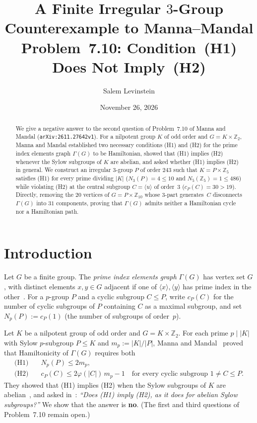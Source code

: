 \documentclass[11pt]{article}
\title{A Finite Irregular $3$-Group Counterexample to Manna--Mandal Problem~7.10: Condition~(H1) Does Not Imply~(H2)}
\author{Salem Levinstein}
\date{November 26, 2026}
\begin{document}
\maketitle

\begin{abstract}
We give a negative answer to the second question of Problem~7.10 of Manna and Mandal (\texttt{arXiv:2611.27642v1}). For a nilpotent group $K$ of odd order and $G = K \times \mathbb{Z}_2$, Manna and Mandal established two necessary conditions (H1) and (H2) for the prime index elements graph $\Gamma(G)$ to be Hamiltonian, showed that (H1) implies (H2) whenever the Sylow subgroups of $K$ are abelian, and asked whether (H1) implies (H2) in general. We construct an irregular $3$-group $P$ of order $243$ such that $K = P \times \mathbb{Z}_5$ satisfies (H1) for every prime dividing $|K|$ ($N_3(P) = 4 \le 10$ and $N_5(\mathbb{Z}_5) = 1 \le 486$) while violating (H2) at the central subgroup $C = \langle u \rangle$ of order~$3$ ($c_P(C) = 30 > 19$). Directly, removing the $20$ vertices of $G = P \times \mathbb{Z}_{10}$ whose $3$-part generates~$C$ disconnects $\Gamma(G)$ into $31$ components, proving that $\Gamma(G)$ admits neither a Hamiltonian cycle nor a Hamiltonian path.
\end{abstract}

\section{Introduction}

Let $G$ be a finite group. The \emph{prime index elements graph} $\Gamma(G)$ has vertex set $G$, with distinct elements $x, y \in G$ adjacent if one of $\langle x \rangle, \langle y \rangle$ has prime index in the other~\cite{MM2026}. For a $p$-group $P$ and a cyclic subgroup $C \le P$, write $c_P(C)$ for the number of cyclic subgroups of $P$ containing $C$ as a maximal subgroup, and set $N_p(P) := c_P(1)$ (the number of subgroups of order~$p$).

Let $K$ be a nilpotent group of odd order and $G = K \times \mathbb{Z}_2$. For each prime $p \mid |K|$ with Sylow $p$-subgroup $P \le K$ and $m_p := |K|/|P|$, Manna and Mandal~\cite[Theorem~7.6]{MM2026} proved that Hamiltonicity of $\Gamma(G)$ requires both
\begin{align*}
  \text{(H1)} &\quad N_p(P) \le 2 m_p, \\
  \text{(H2)} &\quad c_P(C) \le 2\varphi(|C|)\, m_p - 1 \quad \text{for every cyclic subgroup } 1 \ne C \le P.
\end{align*}
They showed that (H1) implies (H2) when the Sylow subgroups of $K$ are abelian~\cite[Corollary~7.8(iii)]{MM2026}, and asked in~\cite[Problem~7.10]{MM2026}: \emph{``Does (H1) imply (H2), as it does for abelian Sylow subgroups?''} We show that the answer is \textbf{no}. (The first and third questions of Problem~7.10 remain open.)
\end{document}
